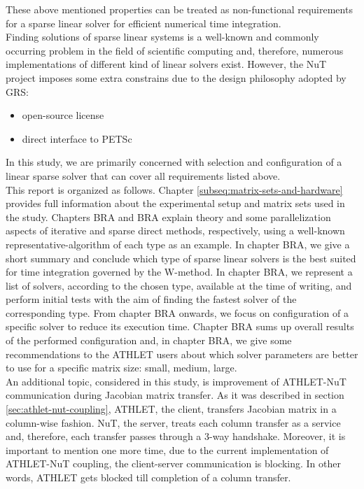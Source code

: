 These above mentioned properties can be treated as non-functional requirements for a sparse linear solver for efficient numerical time integration.\\

 
Finding solutions of sparse linear systems is a well-known and commonly occurring problem in the field of scientific computing and, therefore, numerous implementations of different kind of linear solvers exist. However, the NuT project imposes some extra constrains due to the design philosophy adopted by GRS: \\


\begin{itemize}
	\item open-source license
	\item direct interface to PETSc
\end{itemize}



In this study, we are primarily concerned with selection and configuration of a linear sparse solver that can cover all requirements listed above.\\


This report is organized as follows. Chapter \ref{subseq:matrix-sets-and-hardware} provides full information about the experimental setup and matrix sets used in the study. Chapters BRA and BRA explain theory and some parallelization aspects of iterative and sparse direct methods, respectively, using a  well-known representative-algorithm of each type as an example. In chapter BRA, we give a short summary and conclude which type of sparse linear solvers is the best suited for time integration governed by the W-method. In chapter BRA, we represent a list of solvers, according to the chosen type, available at the time of writing, and perform initial tests with the aim of finding the fastest solver of the corresponding type. From chapter BRA onwards, we focus on configuration of a specific solver to reduce its execution time. Chapter BRA sums up overall results of the performed configuration and, in chapter BRA, we give some recommendations to the ATHLET users about which solver parameters are better to use for a specific matrix size: small, medium, large.\\


An additional topic, considered in this study, is improvement of ATHLET-NuT communication during Jacobian matrix transfer. As it was described in section \ref{sec:athlet-nut-coupling}, ATHLET, the client, transfers Jacobian matrix in a column-wise fashion. NuT, the server, treats each column transfer as a service and, therefore, each transfer passes through a 3-way handshake. Moreover, it is important to mention one more time,   due to the current implementation of ATHLET-NuT coupling, the client-server communication is blocking. In other words, ATHLET gets blocked till completion of a column transfer. \\


